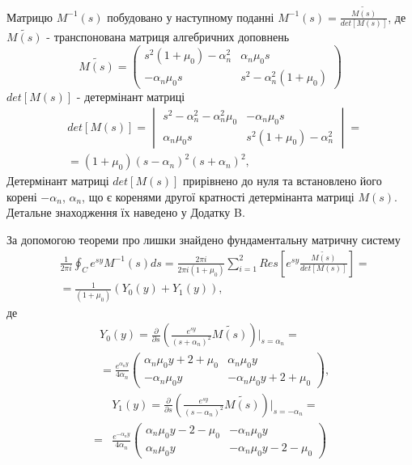 Матрицю $M^{-1}(s)$ побудовано у наступному поданні $M^{-1}(s) = \frac{\widetilde{M(s)}}{det[M(s)]}$,
де $\widetilde{M(s)}$ - транспонована матриця алгебричних доповнень
\begin{equation}
    \widetilde{M(s)} = \begin{pmatrix}
        s^2 (1 + \mu_0) -\alpha_n^2 & \alpha_n \mu_0 s \\
        -\alpha_n \mu_0 s & s^2 -\alpha_n^2(1 + \mu_0)
     \end{pmatrix}
\end{equation}
$det[M(s)]$ - детермінант матриці
\begin{align}
    &det[M(s)] = \begin{vmatrix}
        s^2 - \alpha_n^2 - \alpha_n^2\mu_0 & -\alpha_n \mu_0 s \\
        \alpha_n \mu_0 s & s^2 (1 + \mu_0) -\alpha_n^2
     \end{vmatrix} = \nonumber \\
    &=(1+\mu_0)(s - \alpha_n)^2(s + \alpha_n)^2,
\end{align}
Детермінант матриці $det[M(s)]$ прирівнено до нуля
та встановлено його корені $-\alpha_n$, $\alpha_n$, що є коренями другої кратності детермінанта матриці $M(s)$.
Детальне знаходження їх наведено у Додатку B.

За допомогою теореми про лишки знайдено фундаментальну матричну систему
\begin{align*}
    &\frac{1}{2\pi i} \oint_C e^{sy} M^{-1}(s)ds = \frac{2 \pi i}{2 \pi i (1 + \mu_0)} \sum_{i=1}^{2} Res\left[ e^{sy} \frac{\widetilde{M(s)}}{det[M(s)]} \right] = \\
    & = \frac{1}{(1 + \mu_0)} \left(Y_0(y) + Y_1(y) \right),
\end{align*}
де
\begin{align}\label{fund_mat_0_static_1}
    &Y_0(y) =  \frac{\partial}{\partial s} \left( \frac{e^{sy}}{(s+\alpha_n)^2} \widetilde{M(s)} \right) \Big|_{s=\alpha_n} = \nonumber \\
    &=\frac{e^{\alpha_n y}}{4\alpha_n} \begin{pmatrix}
    \alpha_n \mu_0 y + 2 + \mu_0 & \alpha_n \mu_0 y \\
    -\alpha_n \mu_0 y & -\alpha_n \mu_0 y + 2 + \mu_0
    \end{pmatrix},
\end{align}
\begin{align}\label{fund_mat_1_static_1}
    &Y_1(y) = \frac{\partial}{\partial s} \left(\frac{e^{sy}}{(s-\alpha_n)^2} \widetilde{M(s)} \right) \Big|_{s=-\alpha_n} = \nonumber \\
    =&\frac{e^{-\alpha_n y}}{4\alpha_n} \begin{pmatrix}
    \alpha_n \mu_0 y - 2 - \mu_0 & -\alpha_n \mu_0 y \\
    \alpha_n \mu_0 y & -\alpha_n \mu_0 y - 2 - \mu_0
    \end{pmatrix}
\end{align}

